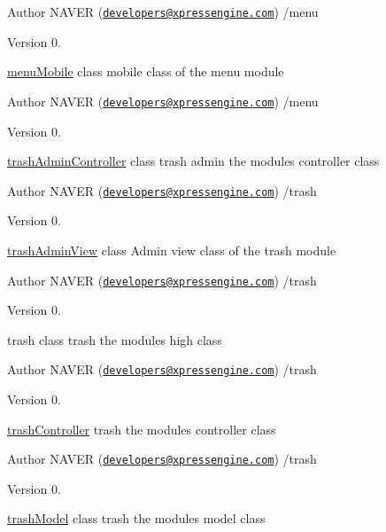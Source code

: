 \begin{DoxyAuthor}{Author}
N\+A\+V\+ER (\href{mailto:developers@xpressengine.com}{\tt developers@xpressengine.\+com}) /menu 
\end{DoxyAuthor}
\begin{DoxyVersion}{Version}
0.
\end{DoxyVersion}
\hyperlink{classmenuMobile}{menu\+Mobile} class mobile class of the menu module

\begin{DoxyAuthor}{Author}
N\+A\+V\+ER (\href{mailto:developers@xpressengine.com}{\tt developers@xpressengine.\+com}) /menu 
\end{DoxyAuthor}
\begin{DoxyVersion}{Version}
0.
\end{DoxyVersion}
\hyperlink{classtrashAdminController}{trash\+Admin\+Controller} class trash admin the module\textquotesingle{}s controller class

\begin{DoxyAuthor}{Author}
N\+A\+V\+ER (\href{mailto:developers@xpressengine.com}{\tt developers@xpressengine.\+com}) /trash 
\end{DoxyAuthor}
\begin{DoxyVersion}{Version}
0.
\end{DoxyVersion}
\hyperlink{classtrashAdminView}{trash\+Admin\+View} class Admin view class of the trash module

\begin{DoxyAuthor}{Author}
N\+A\+V\+ER (\href{mailto:developers@xpressengine.com}{\tt developers@xpressengine.\+com}) /trash 
\end{DoxyAuthor}
\begin{DoxyVersion}{Version}
0.
\end{DoxyVersion}
trash class trash the module\textquotesingle{}s high class

\begin{DoxyAuthor}{Author}
N\+A\+V\+ER (\href{mailto:developers@xpressengine.com}{\tt developers@xpressengine.\+com}) /trash 
\end{DoxyAuthor}
\begin{DoxyVersion}{Version}
0.
\end{DoxyVersion}
\hyperlink{classtrashController}{trash\+Controller} trash the module\textquotesingle{}s controller class

\begin{DoxyAuthor}{Author}
N\+A\+V\+ER (\href{mailto:developers@xpressengine.com}{\tt developers@xpressengine.\+com}) /trash 
\end{DoxyAuthor}
\begin{DoxyVersion}{Version}
0.
\end{DoxyVersion}
\hyperlink{classtrashModel}{trash\+Model} class trash the module\textquotesingle{}s model class

